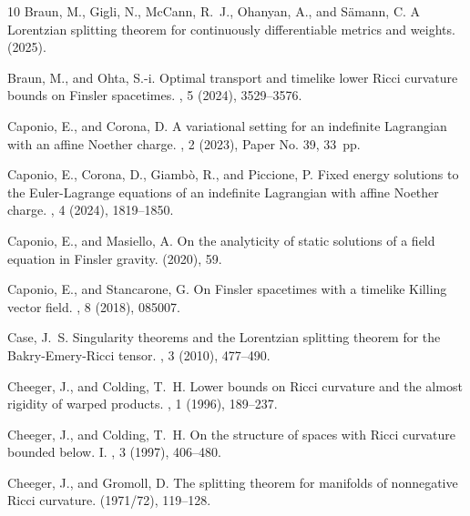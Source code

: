 \documentclass[a4paper,11pt]{article}
\numberwithin{equation}{section}
\theoremstyle{definition}
\theoremstyle{plain}
\begin{document}
\begin{thebibliography}{10}
	{\sc Braun, M., Gigli, N., McCann, R.~J., Ohanyan, A., and S{\"a}mann, C.}
	\newblock A {L}orentzian splitting theorem for continuously differentiable
	metrics and weights.
	 (2025).
	
	{\sc Braun, M., and Ohta, S.-i.}
	\newblock Optimal transport and timelike lower {R}icci curvature bounds on
	{F}insler spacetimes.
	, 5 (2024), 3529--3576.
	
	{\sc Caponio, E., and Corona, D.}
	\newblock A variational setting for an indefinite {L}agrangian with an affine
	{N}oether charge.
	, 2 (2023), Paper
	No. 39, 33~pp.
	
	{\sc Caponio, E., Corona, D., Giamb\`o, R., and Piccione, P.}
	\newblock Fixed energy solutions to the {E}uler-{L}agrange equations of an
	indefinite {L}agrangian with affine {N}oether charge.
	, 4 (2024), 1819--1850.
	
	{\sc Caponio, E., and Masiello, A.}
	\newblock On the analyticity of static solutions of a field equation in
	{F}insler gravity.
	 (2020), 59.
	
	{\sc Caponio, E., and Stancarone, G.}
	\newblock On {F}insler spacetimes with a timelike {K}illing vector field.
	, 8 (2018), 085007.
	
	{\sc Case, J.~S.}
	\newblock Singularity theorems and the {L}orentzian splitting theorem for the
	{B}akry-{E}mery-{R}icci tensor.
	, 3 (2010), 477--490.
	
	{\sc Cheeger, J., and Colding, T.~H.}
	\newblock Lower bounds on {R}icci curvature and the almost rigidity of warped
	products.
	, 1 (1996), 189--237.
	
	{\sc Cheeger, J., and Colding, T.~H.}
	\newblock On the structure of spaces with {R}icci curvature bounded below. {I}.
	, 3 (1997), 406--480.
	
	{\sc Cheeger, J., and Gromoll, D.}
	\newblock The splitting theorem for manifolds of nonnegative {R}icci curvature.
	 (1971/72), 119--128.
	

\end{thebibliography}
\end{document}
